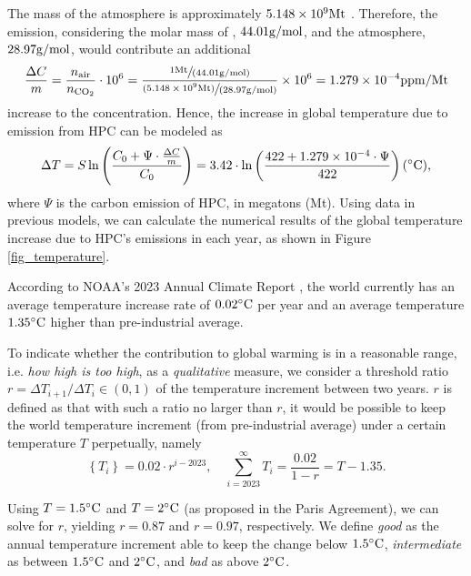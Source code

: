\documentclass[12pt]{article}
\begin{document}
The mass of the atmosphere is approximately $5.148 \times 10^{9} \rm Mt$ \citep{atmosphere_mass}. Therefore, the  emission, considering the molar mass of , $44.01 \rm g/mol$, and the atmosphere, $28.97 \rm g/mol$, would contribute an additional
\begin{equation}
	\frac{\Delta C}{m} = \frac{n_{\rm air}}{n_{\ce{CO2}}} \cdot 10^6
	= \rm \frac{\sfrac{1Mt}{(44.01 g/mol)}}{\sfrac{(5.148 \times 10^9 Mt)}{(28.97 g/mol)}} \times 10^6
	= 1.279 \times 10^{-4} ppm/Mt
\end{equation}
increase to the  concentration. Hence, the increase in global temperature due to  emission from HPC can be modeled as
\begin{equation}
	\Delta T = S \ln \left(\frac{C_0 + \Psi \cdot \frac{\Delta C}{m}}{C_0}\right)
	= 3.42 \cdot \ln \left(\frac{422 + 1.279 \times 10^{-4} \cdot \Psi}{422}\right) \rm (^\circ C),
\end{equation}
where $\Psi$ is the carbon emission of HPC, in megatons (Mt). Using data in previous models, we can calculate the numerical results of the global temperature increase due to HPC's  emissions in each year, as shown in Figure \ref{fig_temperature}.

According to NOAA's 2023 Annual Climate Report \citep{temperature}, the world currently has an average temperature increase rate of $0.02 \rm ^\circ C$ per year and an average temperature $1.35 \rm ^\circ C$ higher than pre-industrial average.

To indicate whether the contribution to global warming is in a reasonable range, i.e. \textit{how high is too high}, as a \textit{qualitative} measure, we consider a threshold ratio $r = \Delta T_{i + 1} / \Delta T_i \in (0, 1)$ of the temperature increment between two years. $r$ is defined as that with such a ratio no larger than $r$, it would be possible to keep the world temperature increment (from pre-industrial average) under a certain temperature $T$ perpetually, namely
\begin{equation}
	\left\{T_i\right\} = 0.02 \cdot r^{i - 2023}, \quad
	\sum_{i = 2023}^\infty T_i = \frac{0.02}{1 - r} = T - 1.35.
\end{equation}

Using $T = 1.5 \rm ^\circ C$ and $T = 2 \rm ^\circ C$ (as proposed in the Paris Agreement), we can solve for $r$, yielding $r = 0.87$ and $r = 0.97$, respectively. We define \textit{good} as the annual temperature increment able to keep the change below $1.5 \rm ^\circ C$, \textit{intermediate} as between $1.5 \rm ^\circ C$ and $2 \rm ^\circ C$, and \textit{bad} as above $2 \rm ^\circ C$.
\end{document}
